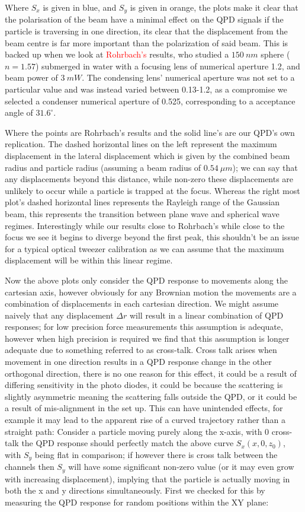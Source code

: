 Where $S_x$ is given in blue, and $S_y$ is given in orange, the plots make it clear that the polarisation of the beam have a minimal effect on the QPD signals if the particle is traversing in one direction, its clear that the displacement from the beam centre is far more important than the polarization of said beam. This is backed up when we look at \textcolor{red}{Rohrbach's} results, who studied a $150\ nm$ sphere ($n=1.57$) submerged in water with a focusing lens of numerical aperture 1.2, and beam power of $3\ mW$. The condensing lens' numerical aperture was not set to a particular value and was instead varied between 0.13-1.2, as a compromise we selected a condenser numerical aperture of 0.525, corresponding to a acceptance angle of $31.6^\circ$. 

Where the points are Rohrbach's results and the solid line's are our QPD's own replication. The dashed horizontal lines on the left represent the maximum displacement in the lateral displacement which is given by the combined beam radius and particle radius (assuming a beam radius of $0.54\ \mu m$); we can say that any displacements beyond this distance, while non-zero these displacements are unlikely to occur while a particle is trapped at the focus. Whereas the right most plot's dashed horizontal lines represents the Rayleigh range of the Gaussian beam, this represents the transition between plane wave and spherical wave regimes. Interestingly while our results close to Rohrbach's while close to the focus we see it begins to diverge beyond the first peak, this shouldn't be an issue for a typical optical tweezer calibration as we can assume that the maximum displacement will be within this linear regime. 

Now the above plots only consider the QPD response to movements along the cartesian axis, however obviously for any Brownian motion the movements are a combination of displacements in each cartesian direction. We might assume naively that any displacement $\Delta r$ will result in a linear combination of QPD responses; for low precision force measurements this assumption is adequate, however when high precision is required we find that this assumption is longer adequate due to something referred to as cross-talk. Cross talk arises when movement in one direction results in a QPD response change in the other orthogonal direction, there is no one reason for this effect, it could be a result of differing sensitivity in the photo diodes, it could be because the scattering is slightly asymmetric meaning the scattering falls outside the QPD, or it could be a result of mis-alignment in the set up. This can have unintended effects, for example it may lead to the apparent rise of a curved trajectory rather than a straight path: Consider a particle moving purely along the x-axis, with 0 cross-talk the QPD response should perfectly match the above curve $S_x(x,0,z_0)$, with $S_y$ being flat in comparison; if however there is cross talk between the channels then $S_y$ will have some significant non-zero value (or it may even grow with increasing displacement), implying that the particle is actually moving in both the x and y directions simultaneously.  First we checked for this by measuring the QPD response for random positions within the XY plane:

